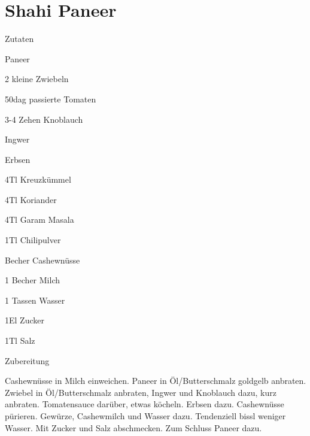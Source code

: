 \chapter*{Shahi Paneer}
\begin{multicols}{2}
 {\Large Zutaten}
 \begin{Zutaten}
		\item Paneer
		\item 2 kleine Zwiebeln
		\item 50dag passierte Tomaten
		\item 3-4 Zehen Knoblauch
		\item Ingwer
		\item Erbsen
		\item 4Tl Kreuzkümmel
		\item 4Tl Koriander
		\item 4Tl Garam Masala
		\item 1Tl Chilipulver
		\item {} Becher Cashewnüsse
		\item 1 Becher Milch
		\item 1 Tassen Wasser
		\item 1El Zucker
		\item 1Tl Salz
		
		
		
		
\end{Zutaten}
\columnbreak
{}
\end{multicols}

{\Large Zubereitung} \newline
\begin{addmargin}[1cm]{0cm}
	Cashewnüsse in Milch einweichen.\newline
	Paneer in Öl/Butterschmalz goldgelb anbraten.\newline
	Zwiebel in Öl/Butterschmalz anbraten, Ingwer und Knoblauch dazu, kurz anbraten.
	Tomatensauce darüber, etwas köcheln.\newline
	Erbsen dazu.\newline
	Cashewnüsse pürieren.\newline
	Gewürze, Cashewmilch und Wasser dazu. Tendenziell bissl weniger Wasser.
	Mit Zucker und Salz abschmecken.\newline
	Zum Schluss Paneer dazu.
	
\end{addmargin}
